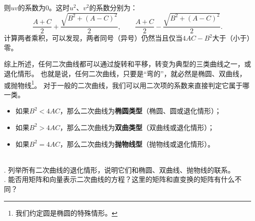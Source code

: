 \documentclass[12pt,UTF8]{ctexbook}
\begin{document}


则$uv$的系数为$0$。这时$u^2$、$v^2$的系数分别为：
$$ \frac{A+C}{2} + \frac{\sqrt{B^2 + (A - C)^2}}{2}, \qquad \frac{A+C}{2} - \frac{\sqrt{B^2 + (A - C)^2}}{2}. $$
计算两者乘积，可以发现，两者同号（异号）仍然当且仅当$4AC - B^2$大于（小于）零。

综上所述，任何二次曲线都可以通过旋转和平移，转变为典型的三类曲线之一，或退化情形。
也就是说，任何二次曲线，只要是“弯的”，就必然是椭圆、双曲线，或抛物线\footnote{我们约定圆是椭圆的特殊情形。}。
对于一般的二次曲线，我们可以用二次项的系数来直接判定它属于哪一类。
\begin{itemize}
    \item 如果$B^2<4AC$，那么二次曲线为\textbf{椭圆类型}（椭圆、圆或退化情形）；
    \item 如果$B^2>4AC$，那么二次曲线为\textbf{双曲类型}（双曲线或退化情形）；
    \item 如果$B^2=4AC$，那么二次曲线为\textbf{抛物线型}（抛物线或退化情形）。
\end{itemize}

\begin{sk}
    \mbox{} \\
    . 列举所有二次曲线的退化情形，说明它们和椭圆、双曲线、抛物线的联系。\\
    . 能否用矩阵和向量表示二次曲线的方程？这里的矩阵和直变换的矩阵有什么不同？
\end{sk}
\end{document}
